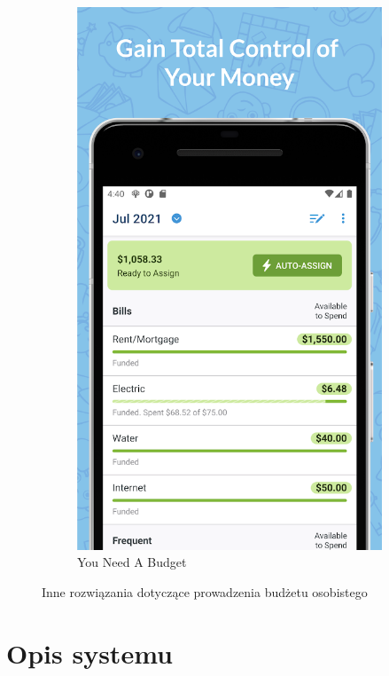 \documentclass[shortabstract,inz]{iithesis}
\begin{document}
\begin{figure}[h]
\begin{subfigure}{0.45\textwidth}
    \includegraphics[width=\textwidth]{ynab.png}
    \caption{You Need A Budget}
    \label{fig:ynab}
\end{subfigure}
        
\caption{Inne rozwiązania dotyczące prowadzenia budżetu osobistego}
\label{fig:mint-ynab}
\end{figure}

\chapter{Opis systemu}
\end{document}
